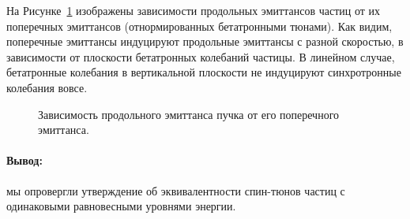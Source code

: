 На Рисунке~\ref{fig:long_emitt_vs_trans_emitt} изображены зависимости продольных эмиттансов частиц от их поперечных эмиттансов (отнормированных бетатронными тюнами). Как видим, поперечные эмиттансы индуцируют продольные эмиттансы с разной скоростью, в зависимости от плоскости бетатронных колебаний частицы. В линейном случае, бетатронные колебания в вертикальной плоскости не индуцируют синхротронные колебания вовсе.
\begin{figure}[h]
	\centering
	\caption{Зависимость продольного эмиттанса пучка от его поперечного эмиттанса.\label{fig:long_emitt_vs_trans_emitt}}
\end{figure}

\paragraph{Вывод:} мы опровергли утверждение об эквивалентности спин-тюнов частиц с одинаковыми равновесными уровнями энергии. 

\clearpage
